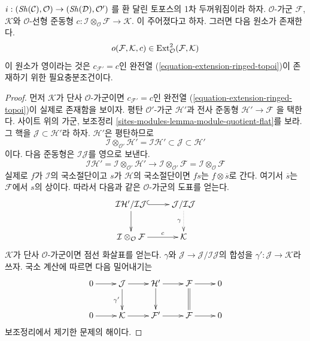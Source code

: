 \begin{lemma}
\label{lemma-inf-obs-ext-ringed-topoi}
$i : (\mathop{\mathit{Sh}}\nolimits(\mathcal{C}), \mathcal{O}) \to (\mathop{\mathit{Sh}}\nolimits(\mathcal{D}), \mathcal{O}')$
를 환 달린 토포스의 1차 두꺼워짐이라 하자. $\mathcal{O}$-가군
$\mathcal{F}$, $\mathcal{K}$와 $\mathcal{O}$-선형 준동형
$c : \mathcal{I} \otimes_\mathcal{O} \mathcal{F} \to \mathcal{K}$.
이 주어졌다고 하자. 그러면 다음 원소가 존재한다.
$$
o(\mathcal{F}, \mathcal{K}, c) \in
\mathop{\mathrm{Ext}}\nolimits^2_\mathcal{O}(\mathcal{F}, \mathcal{K})
$$
이 원소가 영이라는 것은 $c_{\mathcal{F}'} = c$인 완전열
(\ref{equation-extension-ringed-topoi})이 존재하기 위한 필요충분조건이다.
\end{lemma}

\begin{proof}
먼저 $\mathcal{K}$가 단사 $\mathcal{O}$-가군이면
$c_{\mathcal{F}'} = c$인 완전열
(\ref{equation-extension-ringed-topoi})이 실제로 존재함을 보이자. 평탄
$\mathcal{O}'$-가군 $\mathcal{H}'$과 전사 준동형
$\mathcal{H}' \to \mathcal{F}$
을 택한다. 사이트 위의 가군, 보조정리
\ref{sites-modules-lemma-module-quotient-flat}를 보라. 그 핵을
$\mathcal{J} \subset \mathcal{H}'$라 하자. $\mathcal{H}'$은 평탄하므로
$$
\mathcal{I} \otimes_{\mathcal{O}'} \mathcal{H}' =
\mathcal{I}\mathcal{H}'
\subset \mathcal{J} \subset \mathcal{H}'
$$
이다. 다음 준동형은 $\mathcal{I}\mathcal{J}$를 영으로 보낸다.
$$
\mathcal{I}\mathcal{H}' =
\mathcal{I} \otimes_{\mathcal{O}'} \mathcal{H}'
\longrightarrow
\mathcal{I} \otimes_{\mathcal{O}'} \mathcal{F} =
\mathcal{I} \otimes_\mathcal{O} \mathcal{F}
$$
실제로 $f$가 $\mathcal{I}$의 국소절단이고 $s$가 $\mathcal{H}$의
국소절단이면 $fs$는 $f \otimes \overline{s}$로 간다. 여기서
$\overline{s}$는 $\mathcal{F}$에서 $s$의 상이다. 따라서 다음과 같은
$\mathcal{O}$-가군의 도표를 얻는다.
$$
\xymatrix{
\mathcal{I}\mathcal{H}'/\mathcal{I}\mathcal{J}
\ar@{^{(}->}[r] \ar[d] &
\mathcal{J}/\mathcal{I}\mathcal{J} \ar@{..>}[d]_\gamma \\
\mathcal{I} \otimes_\mathcal{O} \mathcal{F} \ar[r]^-c &
\mathcal{K}
}
$$
$\mathcal{K}$가 단사 $\mathcal{O}$-가군이면 점선 화살표를 얻는다.
$\gamma$와 $\mathcal{J} \to \mathcal{J}/\mathcal{I}\mathcal{J}$의 합성을
$\gamma' : \mathcal{J} \to \mathcal{K}$라 쓰자. 국소 계산에 따르면
다음 밀어내기는
$$
\xymatrix{
0 \ar[r] &
\mathcal{J} \ar[r] \ar[d]_{\gamma'} &
\mathcal{H}' \ar[r] \ar[d] &
\mathcal{F} \ar[r] \ar@{=}[d] &
0 \\
0 \ar[r] &
\mathcal{K} \ar[r] &
\mathcal{F}' \ar[r] &
\mathcal{F} \ar[r] &
0
}
$$
보조정리에서 제기한 문제의 해이다.


\end{proof}
